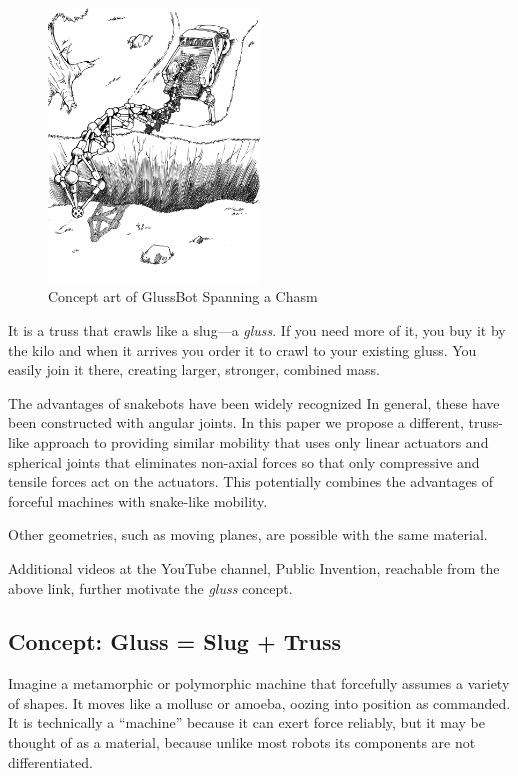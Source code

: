 \documentclass[11pt]{article}
\begin{document}
\begin{figure}[H]
  \centering
    \includegraphics[width=0.5\textwidth]{figures/robotTruckChasm.png}
    \caption[Concept art of GlussBot Spanning a Chasm]{Concept art of GlussBot Spanning a Chasm}
      \label{chasmspan}
\end{figure}

It is a truss that crawls like a slug---a \emph{gluss}.
If you need more of it, you buy it by the kilo and when it arrives you order it
to crawl to your existing gluss. You easily join it there, creating
larger, stronger, combined mass.

The advantages of snakebots have been widely recognized %
In general, these have been constructed
with angular joints. In this paper we propose a different, truss-like approach to providing similar
mobility that uses only linear actuators and spherical joints that eliminates non-axial forces so that only
compressive and tensile forces act on the actuators.
This potentially combines the advantages of forceful machines with snake-like mobility.


Other geometries, such as moving planes, are possible with the same material.

Additional videos at the YouTube channel, Public Invention, reachable from the above link,
further motivate the \emph{gluss} concept.


\subsection{Concept: Gluss = Slug + Truss}

Imagine a metamorphic or polymorphic machine that forcefully assumes a variety of shapes. It moves like a mollusc or amoeba,
oozing into position as commanded. It is technically a ``machine'' because it can exert force reliably, but
it may be thought of as a material, because unlike most robots its components are not differentiated.
\end{document}
